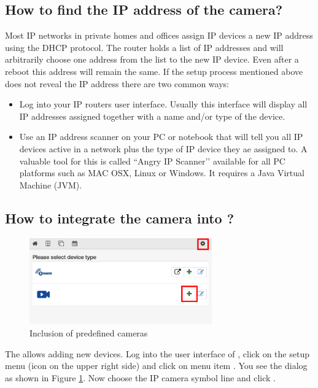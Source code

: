 \subsection{How to find the IP address of the camera?}

Most IP networks in private homes and offices assign IP devices a new IP address using 
the DHCP protocol. The router holds a list of IP addresses and will arbitrarily choose 
one address from the list to the new IP device. Even after a reboot this address will 
remain the same. If the setup process mentioned above does not reveal the IP address 
there are two common ways:
\begin{itemize}
\item Log into your IP routers user interface. Usually this interface will display
 all IP addresses assigned together with a name and/or type of the device.
\item Use an IP address scanner on your PC or notebook that will tell you all IP 
devices active in a network plus the type of IP device they ae assigned to. A valuable 
tool for this is called ``Angry IP Scanner’’ available for all PC platforms such as
 MAC OSX, Linux or Windows. It requires a Java Virtual Machine (JVM).
\end{itemize}

\subsection{How to integrate the camera into \zway?}


\begin{figure}
\begin{center}
\includegraphics[width=0.7\textwidth]{pngs/cap9/camera1.png}
\caption{Inclusion of predefined cameras}
\label{camera1}
\end{center}
\end{figure}

The \zwshui allows adding new devices. Log into the user interface of \zway, 
click on the setup menu (icon on the upper right side) and click on menu item 
. You see the dialog as shown in Figure \ref{camera1}. Now 
choose the IP camera symbol line and click \keystroke{+}.

